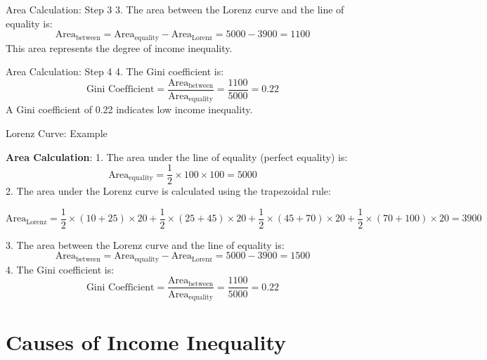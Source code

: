 \documentclass{beamer}
\begin{document}
\begin{frame}{Area Calculation: Step 3}
3. The area between the Lorenz curve and the line of equality is:
\[
\text{Area}_{\text{between}} = \text{Area}_{\text{equality}} - \text{Area}_{\text{Lorenz}} = 5000 - 3900 = 1100
\]
This area represents the degree of income inequality.
\end{frame}

\begin{frame}{Area Calculation: Step 4}
4. The Gini coefficient is:
\[
\text{Gini Coefficient} = \frac{\text{Area}_{\text{between}}}{\text{Area}_{\text{equality}}} = \frac{1100}{5000} = 0.22
\]
A Gini coefficient of 0.22 indicates low income inequality.
\end{frame}


\begin{frame}{Lorenz Curve: Example }


\begin{small}
\begin{footnotesize}
\textbf{Area Calculation}:
1. The area under the line of equality (perfect equality) is:
\[
\text{Area}_{\text{equality}} = \frac{1}{2} \times 100 \times 100 = 5000
\]
2. The area under the Lorenz curve is calculated using the trapezoidal rule:
\begin{scriptsize}

\[
\text{Area}_{\text{Lorenz}} = \frac{1}{2} \times (10 + 25) \times 20 + \frac{1}{2} \times (25 + 45) \times 20 + \frac{1}{2} \times (45 + 70) \times 20 + \frac{1}{2} \times (70 + 100) \times 20 = 3900
\]

\end{scriptsize}
3. The area between the Lorenz curve and the line of equality is:
\[
\text{Area}_{\text{between}} = \text{Area}_{\text{equality}} - \text{Area}_{\text{Lorenz}} = 5000 - 3900 = 1500
\]
4. The Gini coefficient is:
\[
\text{Gini Coefficient} = \frac{\text{Area}_{\text{between}}}{\text{Area}_{\text{equality}}} = \frac{1100}{5000} = 0.22
\]
\end{footnotesize}
\end{small}
\end{frame}









\section{Causes of Income Inequality}
\end{document}
